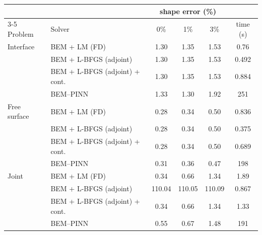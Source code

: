 \begin{tabular}{llcccc}
\toprule
 & & \multicolumn{3}{c}{shape error (\%)} & \\
\cmidrule(lr){3-5}
Problem & Solver & 0\% & 1\% & 3\% & time (s)\\
\midrule
Interface & BEM + LM (FD) & 1.30 & 1.35 & 1.53 & 0.76\\
 & BEM + L-BFGS (adjoint) & 1.30 & 1.35 & 1.53 & 0.492\\
 & BEM + L-BFGS (adjoint) + cont. & 1.30 & 1.35 & 1.53 & 0.884\\
 & BEM--PINN & 1.33 & 1.30 & 1.92 & 251\\
\midrule
Free surface & BEM + LM (FD) & 0.28 & 0.34 & 0.50 & 0.836\\
 & BEM + L-BFGS (adjoint) & 0.28 & 0.34 & 0.50 & 0.375\\
 & BEM + L-BFGS (adjoint) + cont. & 0.28 & 0.34 & 0.50 & 0.689\\
 & BEM--PINN & 0.31 & 0.36 & 0.47 & 198\\
\midrule
Joint & BEM + LM (FD) & 0.34 & 0.66 & 1.34 & 1.89\\
 & BEM + L-BFGS (adjoint) & 110.04 & 110.05 & 110.09 & 0.867\\
 & BEM + L-BFGS (adjoint) + cont. & 0.34 & 0.66 & 1.34 & 1.33\\
 & BEM--PINN & 0.55 & 0.67 & 1.48 & 191\\
\bottomrule
\end{tabular}

